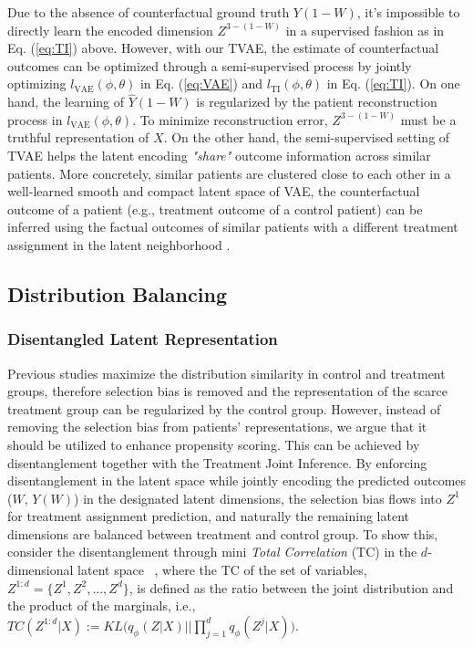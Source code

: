 Due to the absence of counterfactual ground truth $Y(1-W)$, it's impossible to directly learn the encoded dimension $Z^{3-(1-W)}$ in a supervised fashion as in Eq. (\ref{eq:TI}) above. However, with our TVAE,
the estimate of counterfactual outcomes can be optimized through a semi-supervised process by jointly optimizing $l_{\text{VAE}}(\phi,\theta)$ in Eq. (\ref{eq:VAE}) and $l_{\text{TI}}(\phi,\theta)$ in Eq. (\ref{eq:TI}). 
On one hand, the learning of $\hat{Y}(1-W)$ is regularized by the patient reconstruction process in $l_{\text{VAE}}(\phi,\theta)$. To minimize reconstruction error, $Z^{3-(1-W)}$  must be a truthful representation of $X$.
On the other hand, the semi-supervised setting of TVAE helps the latent encoding \textit{"share"} outcome information across similar patients.
More concretely, similar patients are clustered close to each other in a well-learned smooth and compact latent space of VAE, the counterfactual outcome of a patient (e.g., treatment outcome of a control patient) can be inferred using the factual outcomes of similar patients with a different treatment assignment in the latent neighborhood . 






\subsection{Distribution Balancing}
\label{sec:DB}
\subsubsection{Disentangled Latent Representation}
Previous studies maximize the distribution similarity in control and treatment groups, therefore selection bias is removed and the representation of the scarce treatment group can be regularized \cite{johansson2016bnn,yao2018site,shalit2017cfrnet} by the control group. However, 
instead of removing the selection bias from patients' representations, we argue that it should be utilized to enhance propensity scoring. This can be achieved by disentanglement \cite{chen2018isolating,xuebingkdd} together with the Treatment Joint Inference. By enforcing disentanglement in the latent space while jointly encoding the predicted outcomes ($W$, $Y(W)$) in the designated latent dimensions, the selection bias flows into $Z^1$ for treatment assignment prediction, and naturally the remaining latent dimensions are balanced between treatment and control group. To show this, consider the disentanglement through mini \textit{Total Correlation} (TC) in the $d$-dimensional latent space ~\cite{chen2018isolating},
where the TC of the set of variables, $Z^{1:d}=\{Z^1, Z^2, ..., Z^d\}$, is defined as the ratio between the joint distribution and the product of the marginals, i.e., 
$TC(Z^{1:d}|X) := KL\bigl(q_{{\phi}}(Z|X) \bigl|\bigr|  \prod_{j=1}^{d} q_{{\phi}}(Z^j|X)\bigr)$.


